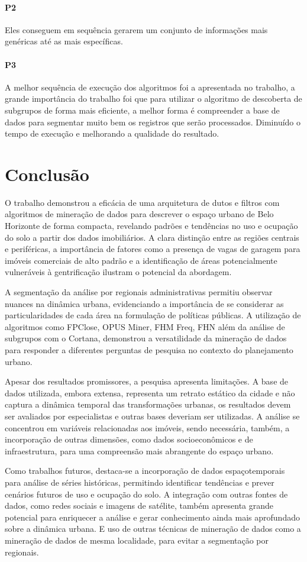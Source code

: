 \documentclass[12pt]{article}
\begin{document}
\paragraph{P2} Eles conseguem em sequência gerarem um conjunto de informações mais genéricas até as mais específicas.
\paragraph{P3} A melhor sequência de execução dos algoritmos foi a apresentada no trabalho, a grande importância do trabalho foi que para utilizar o algoritmo de descoberta de subgrupos de forma mais eficiente, a melhor forma é compreender a base de dados para segmentar muito bem os registros que serão processados. Diminuído o tempo de execução e melhorando a qualidade do resultado.

\section{Conclusão}
O trabalho demonstrou a eficácia de uma arquitetura de dutos e filtros com algoritmos de mineração de dados para descrever o espaço urbano de Belo Horizonte de forma compacta, revelando padrões e tendências no uso e ocupação do solo a partir dos dados imobiliários. A clara distinção entre as regiões centrais e periféricas, a importância de fatores como a presença de vagas de garagem para imóveis comerciais de alto padrão e a identificação de áreas potencialmente vulneráveis à gentrificação ilustram o potencial da abordagem.

A segmentação da análise por regionais administrativas permitiu observar nuances na dinâmica urbana, evidenciando a importância de se considerar as particularidades de cada área na formulação de políticas públicas. A utilização de algoritmos como FPClose, OPUS Miner, FHM Freq, FHN além da análise de subgrupos com o Cortana, demonstrou a versatilidade da mineração de dados para responder a diferentes perguntas de pesquisa no contexto do planejamento urbano.

Apesar dos resultados promissores, a pesquisa apresenta limitações. A base de dados utilizada, embora extensa, representa um retrato estático da cidade e não captura a dinâmica temporal das transformações urbanas, os resultados devem ser avaliados por especialistas e outras bases deveriam ser utilizadas. A análise se concentrou em variáveis relacionadas aos imóveis, sendo necessária, também, a incorporação de outras dimensões, como dados socioeconômicos e de infraestrutura, para uma compreensão mais abrangente do espaço urbano.

Como trabalhos futuros, destaca-se a incorporação de dados espaçotemporais para análise de séries históricas, permitindo identificar tendências e prever cenários futuros de uso e ocupação do solo. A integração com outras fontes de dados, como redes sociais e imagens de satélite, também apresenta grande potencial para enriquecer a análise e gerar conhecimento ainda mais aprofundado sobre a dinâmica urbana. E uso de outras técnicas de mineração de dados como a mineração de dados de mesma localidade, para evitar a segmentação por regionais.


\end{document}
